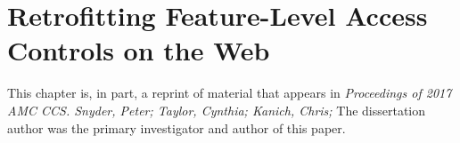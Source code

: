 \chapter{Retrofitting Feature-Level Access Controls on the Web}
\label{current-web}

This chapter is, in part, a reprint of material that appears in
\textit{Proceedings of 2017 AMC CCS. Snyder, Peter; Taylor,
Cynthia; Kanich, Chris;} The dissertation author was the primary investigator and
author of this paper.





